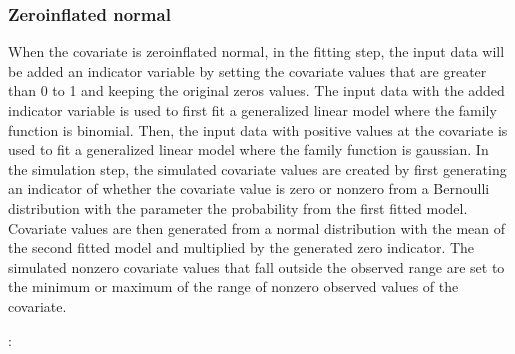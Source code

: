 \documentclass[letterpaper,10pt,english]{sphinxmanual}
\begin{document}
\subsubsection{Zero\sphinxhyphen{}inflated normal}
\label{\detokenize{Specifications/Covariate models:zero-inflated-normal}}
\sphinxAtStartPar
When the covariate is zero\sphinxhyphen{}inflated normal, in the fitting step, the input data will be added an indicator variable
by setting the covariate values that are greater than 0 to 1 and keeping the original zeros values.
The input data with the added indicator variable is used to first fit a generalized linear model where
the family function is binomial. Then, the input data with positive values at the covariate is used to
fit a generalized linear model where the family function is gaussian. In the simulation step,
the simulated covariate values are created by first generating an indicator of whether the covariate value is zero
or non\sphinxhyphen{}zero from a Bernoulli distribution with the parameter the probability from the first fitted model. Covariate
values are then generated from a normal distribution with the mean of the second fitted model
and multiplied by the generated zero indicator. The simulated non\sphinxhyphen{}zero covariate values that fall outside
the observed range are set to the minimum or maximum of the range of non\sphinxhyphen{}zero observed values
of the covariate.

\sphinxAtStartPar
{}:

\begin{sphinxVerbatim}[commandchars=\\\{\}]
  \PYG{p}{[} \PYG{p}{]}
  \PYG{p}{[} \PYG{p}{]}
  \PYG{p}{[}
              \PYG{p}{]}

            
\end{sphinxVerbatim}
\end{document}
